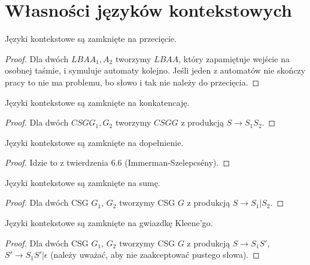 \section{Własności języków kontekstowych}

\begin{lemma}
    Języki kontekstowe są zamknięte na przecięcie.
\end{lemma}

\begin{proof}
    Dla dwóch \( LBA A_1, A_2\) tworzymy \(LBA A\), który zapamiętuje wejście na osobnej taśmie, i symuluje automaty kolejno.
    Jeśli jeden z automatów nie skończy pracy to nie ma problemu, bo słowo i tak nie należy do przecięcia.
\end{proof}

\begin{lemma}
    Języki kontekstowe są zamknięte na konkatencaję.
\end{lemma}
    
\begin{proof}
    Dla dwóch \(CSG G_1, G_2\) tworzymy \(CSG G\) z produkcją \(S \rightarrow S_1S_2\).
\end{proof}

\begin{lemma}
    Języki kontekstowe są zamknięte na dopełnienie.
\end{lemma}
    
\begin{proof}
    Idzie to z twierdzenia 6.6 (Immerman-Szelepcsény).
\end{proof}

\begin{lemma}
    Języki kontekstowe są zamknięte na sumę.
\end{lemma}
    
\begin{proof}
    Dla dwóch CSG \(G_1\), \(G_2\) tworzymy CSG \(G\) z produkcją \(S \rightarrow S_1|S_2\).
\end{proof}

\begin{lemma}
    Języki kontekstowe są zamknięte na gwiazdkę Kleene'go.
\end{lemma}
    
\begin{proof}
    Dla dwóch CSG \(G_1\), \(G_2\) tworzymy CSG \(G\) z produkcją \(S \rightarrow S_1S'\), \(S' \rightarrow S_1S'|\epsilon\) (należy uważać, aby nie zaakceptować pustego słowa).
\end{proof}